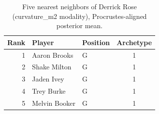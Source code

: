 \begin{table}[htbp]
  \centering\small
  \begin{tabular}{rllc}
    \toprule
    Rank & Player & Position & Archetype \\
    \midrule
    1 & Aaron Brooks & G & 1 \\
    2 & Shake Milton & G & 1 \\
    3 & Jaden Ivey & G & 1 \\
    4 & Trey Burke & G & 1 \\
    5 & Melvin Booker & G & 1 \\
    \bottomrule
  \end{tabular}
  \caption{Five nearest neighbors of Derrick Rose (curvature_m2 modality), Procrustes-aligned posterior mean.}
  \label{tab:Derrick_Rose_neighbors_curvature_m2}
\end{table}

